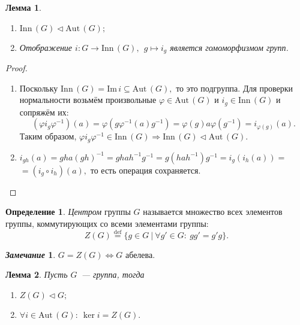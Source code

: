\documentclass[a4paper, 14pt]{extarticle}
\newcommand{\deq}{\stackrel{\mathrm{def}}{=}}
\newcommand{\im}{\mathrm{Im} \,}
\newcommand{\Aut}{\mathrm{Aut} \,}
\newcommand{\Inn}{\mathrm{Inn} \,}
\renewcommand{\phi}{\varphi}
\theoremstyle{definition}
\newtheorem*{remark}{\textit{Замечание}}
\newtheorem{definition}{Определение}
\theoremstyle{plain}
\numberwithin{theorem}{section}
\numberwithin{definition}{section}
\numberwithin{statement}{section}
\newtheorem{lemma}{Лемма}
\numberwithin{lemma}{section}
\numberwithin{consequence}{section}
\begin{document}
          \begin{lemma}
          \
            \begin{enumerate}
            \setlength\itemsep{0.1em}
                \item ${\Inn(G) \lhd \Aut(G);}$
                \item Отображение ${i : G \rightarrow \Inn(G), \ \ g \mapsto i_g}$ является гомоморфизмом групп.
            \end{enumerate}
          \end{lemma}
          \begin{proof}
          \
            \begin{enumerate}
                \setlength\itemsep{0.1em}
                \item Поскольку ${\Inn(G) = \im i \subseteq \Aut(G),}$ то это подгруппа. \newline
              Для проверки нормальности возьмём произвольные ${\phi \in \Aut(G)}$ и ${i_g \in \Inn(G)}$ и сопряжём их:
              \begin{equation*}
                  (\phi i_g \phi^{-1})(a) = \phi(g \phi^{-1}(a) g^{-1}) =  \phi(g) a \phi(g^{-1}) = i_{\phi(g)}(a).
              \end{equation*}
              Таким образом, ${\phi i_g \phi^{-1} \in \Inn(G) \Rightarrow \Inn(G) \lhd \Aut(G).}$
                \item ${i_{gh}(a) = gha(gh)^{-1} = ghah^{-1}g^{-1} = g(hah^{-1})g^{-1} = i_g(i_h(a)) =}$ ${= (i_g \circ i_h)(a),}$ то есть операция сохраняется. \qedhere
            \end{enumerate}
            \end{proof}
            \begin{definition}
              \textit{Центром} группы $G$ называется множество всех элементов группы, коммутирующих со всеми элементами группы:
              \begin{equation*}
                  Z(G) \deq \{g \in G \ | \ \forall g' \in G{:} \ gg' = g'g\}.
              \end{equation*}
          \end{definition}
          \begin{remark}
              ${G = Z(G) \Leftrightarrow G}$ абелева.
          \end{remark}
          \newpage
          \begin{lemma}
              Пусть $G$~--- группа, тогда
              \begin{enumerate}
              \setlength\itemsep{0.1em}
                  \item ${Z(G) \lhd G;}$
                  \item ${\forall i \in \Aut(G){:} \ \ker i = Z(G).}$
              \end{enumerate}
          \end{lemma}
\end{document}
